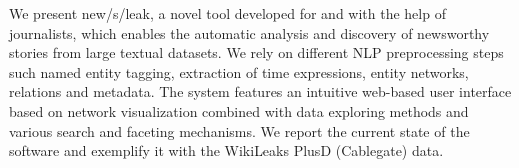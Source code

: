 We present new/s/leak, a novel tool developed for and with the help of journalists, which enables the automatic analysis and discovery of newsworthy stories from large textual datasets. We rely on different NLP preprocessing steps such named entity tagging, extraction of time expressions, entity networks, relations and metadata. The system features an intuitive web-based user interface based on network visualization combined with data exploring methods and various search and faceting mechanisms. We report the current state of the software and exemplify it with the WikiLeaks PlusD (Cablegate) data.
